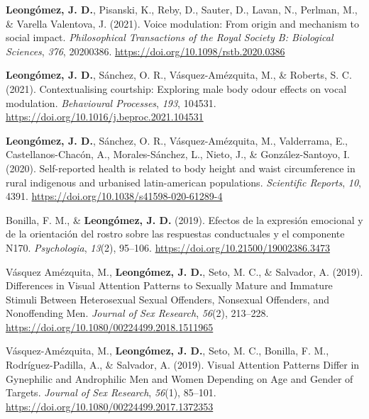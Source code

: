 \documentclass[11pt, a4paper]{awesome-cv}
\begin{document}
\leavevmode{}%
\textbf{Leongómez, J. D.}, Pisanski, K., Reby, D., Sauter, D., Lavan,
N., Perlman, M., \& Varella Valentova, J. (2021). Voice modulation:
{From} origin and mechanism to social impact. \emph{Philosophical
Transactions of the Royal Society B: Biological Sciences}, \emph{376},
20200386. \url{https://doi.org/10.1098/rstb.2020.0386}

\leavevmode{}%
\textbf{Leongómez, J. D.}, Sánchez, O. R., Vásquez-Amézquita, M., \&
Roberts, S. C. (2021). Contextualising courtship: Exploring male body
odour effects on vocal modulation. \emph{Behavioural Processes},
\emph{193}, 104531. \url{https://doi.org/10.1016/j.beproc.2021.104531}

\leavevmode{}%
\textbf{Leongómez, J. D.}, Sánchez, O. R., Vásquez-Amézquita, M.,
Valderrama, E., Castellanos-Chacón, A., Morales-Sánchez, L., Nieto, J.,
\& González-Santoyo, I. (2020). Self-reported health is related to body
height and waist circumference in rural indigenous and urbanised
latin-american populations. \emph{Scientific Reports}, \emph{10}, 4391.
\url{https://doi.org/10.1038/s41598-020-61289-4}

\leavevmode{}%
Bonilla, F. M., \& \textbf{Leongómez, J. D.} (2019). {Efectos de la
expresi{ó}n emocional y de la orientaci{ó}n del rostro sobre las
respuestas conductuales y el componente N170}. \emph{Psychologia},
\emph{13}(2), 95--106. \url{https://doi.org/10.21500/19002386.3473}

\leavevmode{}%
Vásquez Amézquita, M., \textbf{Leongómez, J. D.}, Seto, M. C., \&
Salvador, A. (2019). {Differences in Visual Attention Patterns to
Sexually Mature and Immature Stimuli Between Heterosexual Sexual
Offenders, Nonsexual Offenders, and Nonoffending Men}. \emph{Journal of
Sex Research}, \emph{56}(2), 213--228.
\url{https://doi.org/10.1080/00224499.2018.1511965}

\leavevmode{}%
Vásquez-Amézquita, M., \textbf{Leongómez, J. D.}, Seto, M. C., Bonilla,
F. M., Rodríguez-Padilla, A., \& Salvador, A. (2019). {Visual Attention
Patterns Differ in Gynephilic and Androphilic Men and Women Depending on
Age and Gender of Targets}. \emph{Journal of Sex Research},
\emph{56}(1), 85--101.
\url{https://doi.org/10.1080/00224499.2017.1372353}
\end{document}
